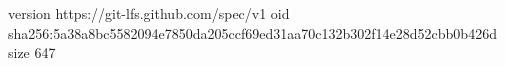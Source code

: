 version https://git-lfs.github.com/spec/v1
oid sha256:5a38a8bc5582094e7850da205ccf69ed31aa70c132b302f14e28d52cbb0b426d
size 647
